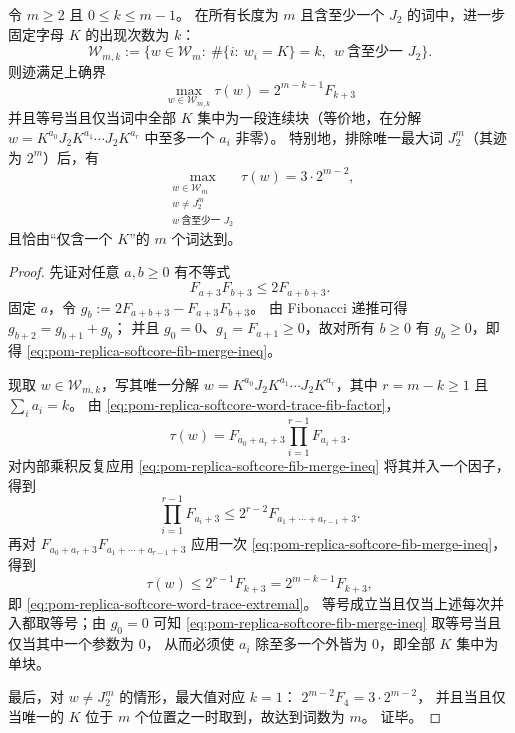 \begin{proposition}[固定 \(K\) 计数下的词迹极值]\label{prop:pom-replica-softcore-word-trace-extremal}
令 \(m\ge 2\) 且 \(0\le k\le m-1\)。
在所有长度为 \(m\) 且含至少一个 \(J_2\) 的词中，进一步固定字母 \(K\) 的出现次数为 \(k\)：
\[
\mathcal{W}_{m,k}:=\bigl\{w\in\mathcal{W}_m:\ \#\{i:\ w_i=K\}=k,\ \ w\ \text{含至少一 }J_2\bigr\}.
\]
则迹满足上确界
\begin{equation}\label{eq:pom-replica-softcore-word-trace-extremal}
\boxed{\;
\max_{w\in\mathcal{W}_{m,k}}\tau(w)=2^{m-k-1}F_{k+3}\;}
\end{equation}
并且等号当且仅当词中全部 \(K\) 集中为一段连续块（等价地，在分解 \(w=K^{a_0}J_2K^{a_1}\cdots J_2K^{a_r}\) 中至多一个 \(a_i\) 非零）。
特别地，排除唯一最大词 \(J_2^m\)（其迹为 \(2^m\)）后，有
\[
\max_{\substack{w\in\mathcal{W}_m\\ w\neq J_2^m\\ w\ \text{含至少一 }J_2}}\tau(w)=3\cdot 2^{m-2},
\]
且恰由“仅含一个 \(K\)”的 \(m\) 个词达到。
\end{proposition}
\begin{proof}
先证对任意 \(a,b\ge 0\) 有不等式
\begin{equation}\label{eq:pom-replica-softcore-fib-merge-ineq}
F_{a+3}F_{b+3}\le 2F_{a+b+3}.
\end{equation}
固定 \(a\)，令 \(g_b:=2F_{a+b+3}-F_{a+3}F_{b+3}\)。
由 Fibonacci 递推可得 \(g_{b+2}=g_{b+1}+g_b\)；
并且 \(g_0=0\)、\(g_1=F_{a+1}\ge 0\)，故对所有 \(b\ge 0\) 有 \(g_b\ge 0\)，即得 \eqref{eq:pom-replica-softcore-fib-merge-ineq}。
\par
现取 \(w\in\mathcal{W}_{m,k}\)，写其唯一分解 \(w=K^{a_0}J_2K^{a_1}\cdots J_2K^{a_r}\)，其中 \(r=m-k\ge 1\) 且 \(\sum_i a_i=k\)。
由 \eqref{eq:pom-replica-softcore-word-trace-fib-factor}，
\[
\tau(w)=F_{a_0+a_r+3}\prod_{i=1}^{r-1}F_{a_i+3}.
\]
对内部乘积反复应用 \eqref{eq:pom-replica-softcore-fib-merge-ineq} 将其并入一个因子，得到
\[
\prod_{i=1}^{r-1}F_{a_i+3}\le 2^{r-2}F_{a_1+\cdots+a_{r-1}+3}.
\]
再对 \(F_{a_0+a_r+3}F_{a_1+\cdots+a_{r-1}+3}\) 应用一次 \eqref{eq:pom-replica-softcore-fib-merge-ineq}，得到
\[
\tau(w)\le 2^{r-1}F_{k+3}=2^{m-k-1}F_{k+3},
\]
即 \eqref{eq:pom-replica-softcore-word-trace-extremal}。
等号成立当且仅当上述每次并入都取等号；由 \(g_0=0\) 可知 \eqref{eq:pom-replica-softcore-fib-merge-ineq} 取等号当且仅当其中一个参数为 \(0\)，
从而必须使 \(a_i\) 除至多一个外皆为 \(0\)，即全部 \(K\) 集中为单块。
\par
最后，对 \(w\neq J_2^m\) 的情形，最大值对应 \(k=1\)：
\(
2^{m-2}F_4=3\cdot 2^{m-2}
\)，
并且当且仅当唯一的 \(K\) 位于 \(m\) 个位置之一时取到，故达到词数为 \(m\)。
证毕。
\end{proof}

